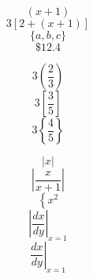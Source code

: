 \documentclass[12pt]{article}
\begin{document}
$$(x+1)$$
$$3[2+(x+1)]$$
$$\{a,b,c\}$$
$$\$12.4$$

$$3\left(\frac{2}{3}\right)$$
$$3\left[\frac{3}{5}\right]$$
$$3\left\{\frac{4}{5}\right\}$$

$$|x|$$
$$\left|\frac{x}{x+1}\right|$$
$$\left\{x^2\right.$$
$$\left|\frac{dx}{dy}\right|_{x=1}$$
$$\left.\frac{dx}{dy}\right|_{x=1}$$
\end{document}
